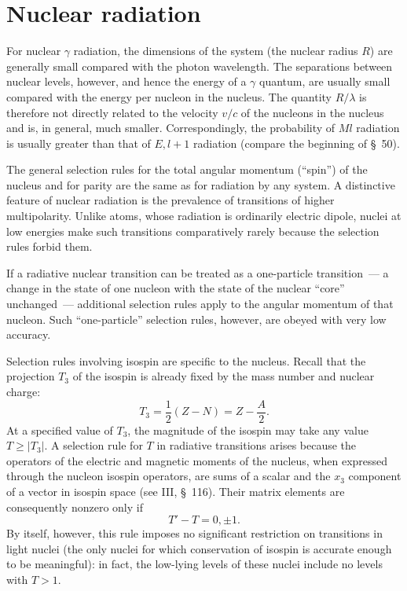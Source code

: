 \section{Nuclear radiation}

For nuclear $\gamma$ radiation, the dimensions of the system (the nuclear radius $R$) are generally small compared with the photon wavelength. The separations between nuclear levels, however, and hence the energy of a $\gamma$ quantum, are usually small compared with the energy per nucleon in the nucleus. The quantity $R/\lambda$ is therefore not directly related to the velocity $v/c$ of the nucleons in the nucleus and is, in general, much smaller. Correspondingly, the probability of $Ml$ radiation is usually greater than that of $E,l+1$ radiation (compare the beginning of \S~50).

The general selection rules for the total angular momentum (``spin'') of the nucleus and for parity are the same as for radiation by any system. A distinctive feature of nuclear radiation is the prevalence of transitions of higher multipolarity. Unlike atoms, whose radiation is ordinarily electric dipole, nuclei at low energies make such transitions comparatively rarely because the selection rules forbid them.

If a radiative nuclear transition can be treated as a one-particle transition~--- a change in the state of one nucleon with the state of the nuclear ``core'' unchanged~--- additional selection rules apply to the angular momentum of that nucleon. Such ``one-particle'' selection rules, however, are obeyed with very low accuracy.

Selection rules involving isospin are specific to the nucleus. Recall that the projection $T_3$ of the isospin is already fixed by the mass number and nuclear charge:
\[
T_3=\frac12(Z-N)=Z-\frac A2.
\]
At a specified value of $T_3$, the magnitude of the isospin may take any value $T\geqslant|T_3|$. A selection rule for $T$ in radiative transitions arises because the operators of the electric and magnetic moments of the nucleus, when expressed through the nucleon isospin operators, are sums of a scalar and the $x_3$ component of a vector in isospin space (see III, \S~116). Their matrix elements are consequently nonzero only if
\begin{equation}
T'-T=0,\pm1.
\tag{55.1}
\end{equation}
By itself, however, this rule imposes no significant restriction on transitions in light nuclei (the only nuclei for which conservation of isospin is accurate enough to be meaningful): in fact, the low-lying levels of these nuclei include no levels with $T>1$.

